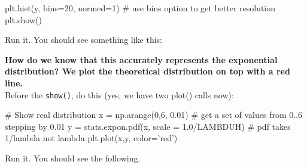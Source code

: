 \begin{fullwidth}
\begin{pyverbatim}
plt.hist(y, bins=20, normed=1) # use bins option to get better resolution
plt.show()
\end{pyverbatim}

\step Run it. You should see something like this:


{\bf How do we know that this accurately represents the exponential distribution? We plot the theoretical distribution on top with a red line.}\\

\step Before the {\tt show()}, do this (yes, we have two plot() calls now):

\begin{pyverbatim}
# Show real distribution
x = np.arange(0,6, 0.01) # get a set of values from 0..6 stepping by 0.01
y = stats.expon.pdf(x, scale = 1.0/LAMBDUH) # pdf takes 1/lambda not lambda
plt.plot(x,y, color='red')
\end{pyverbatim}

\step Run it.  You should see the following.\\



\end{fullwidth}
